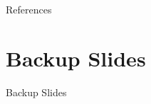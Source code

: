 \documentclass[aspectratio=169]{beamer}                    %
\renewcommand{\pageword}{Slide}
\begin{document}
\begingroup
\renewcommand{\insertframenumber}{}
\renewcommand{\pageword}{}
\begin{frame}{References}
	\printbibliography
\end{frame}

\appendix %
\section*{Backup Slides}
\begin{frame}[noframenumbering]
	\centering
	\vfill
	{\fontsize{40}{50}\selectfont Backup Slides}
	\vfill
\end{frame}



\endgroup
\end{document}
